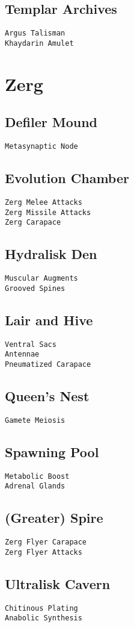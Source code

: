 \subsection{Templar Archives}
\verb|Argus Talisman|\\
\verb|Khaydarin Amulet|

\section{Zerg}

\subsection{Defiler Mound}
\verb|Metasynaptic Node|

\subsection{Evolution Chamber}
\verb|Zerg Melee Attacks|\\
\verb|Zerg Missile Attacks|\\
\verb|Zerg Carapace|

\subsection{Hydralisk Den}
\verb|Muscular Augments|\\
\verb|Grooved Spines|

\subsection{Lair and Hive}
\verb|Ventral Sacs|\\
\verb|Antennae|\\
\verb|Pneumatized Carapace|

\subsection{Queen's Nest}
\verb|Gamete Meiosis|

\subsection{Spawning Pool}
\verb|Metabolic Boost|\\
\verb|Adrenal Glands|

\subsection{(Greater) Spire}
\verb|Zerg Flyer Carapace|\\
\verb|Zerg Flyer Attacks|

\subsection{Ultralisk Cavern}
\verb|Chitinous Plating|\\
\verb|Anabolic Synthesis|

